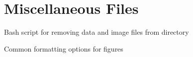 \documentclass[a4paper,twoside,fleqn,12pt]{extarticle}
\begin{document}
\section{Miscellaneous Files}

\begin{description}[leftmargin=!,labelwidth=\widthof{\textbf{plot\_opts}}]
    \item[clean] Bash script for removing data and image files from directory
    \item[plot\_opts] Common formatting options for figures
\end{description}




%


%

\end{document}
